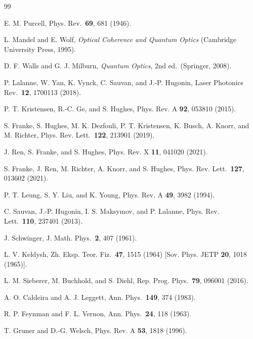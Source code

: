 \documentclass[12pt]{article}
\begin{document}
\begin{thebibliography}{99}

E. M. Purcell,
Phys. Rev.\ \textbf{69}, 681 (1946).

L. Mandel and E. Wolf, \textit{Optical Coherence and Quantum Optics}
(Cambridge University Press, 1995).

D. F. Walls and G. J. Milburn, \textit{Quantum Optics}, 2nd ed.\
(Springer, 2008).

P. Lalanne, W. Yan, K. Vynck, C. Sauvan, and J.-P. Hugonin,
Laser Photonics Rev.\ \textbf{12}, 1700113 (2018).

P. T. Kristensen, R.-C. Ge, and S. Hughes,
Phys. Rev. A \textbf{92}, 053810 (2015).

S. Franke, S. Hughes, M. K. Dezfouli, P. T. Kristensen, K. Busch,
A. Knorr, and M. Richter,
Phys. Rev. Lett.\ \textbf{122}, 213901 (2019).

J. Ren, S. Franke, and S. Hughes,
Phys. Rev. X \textbf{11}, 041020 (2021).

S. Franke, J. Ren, M. Richter, A. Knorr, and S. Hughes,
Phys. Rev. Lett.\ \textbf{127}, 013602 (2021).

P. T. Leung, S. Y. Liu, and K. Young,
Phys. Rev. A \textbf{49}, 3982 (1994).

C. Sauvan, J.-P. Hugonin, I. S. Maksymov, and P. Lalanne,
Phys. Rev. Lett.\ \textbf{110}, 237401 (2013).

J. Schwinger, J. Math. Phys.\ \textbf{2}, 407 (1961).

L. V. Keldysh, Zh. Eksp. Teor. Fiz.\ \textbf{47}, 1515 (1964)
[Sov. Phys. JETP \textbf{20}, 1018 (1965)].

L. M. Sieberer, M. Buchhold, and S. Diehl,
Rep. Prog. Phys.\ \textbf{79}, 096001 (2016).

A. O. Caldeira and A. J. Leggett,
Ann. Phys.\ \textbf{149}, 374 (1983).

R. P. Feynman and F. L. Vernon,
Ann. Phys.\ \textbf{24}, 118 (1963).

T. Gruner and D.-G. Welsch,
Phys. Rev. A \textbf{53}, 1818 (1996).


\end{thebibliography}
\end{document}
